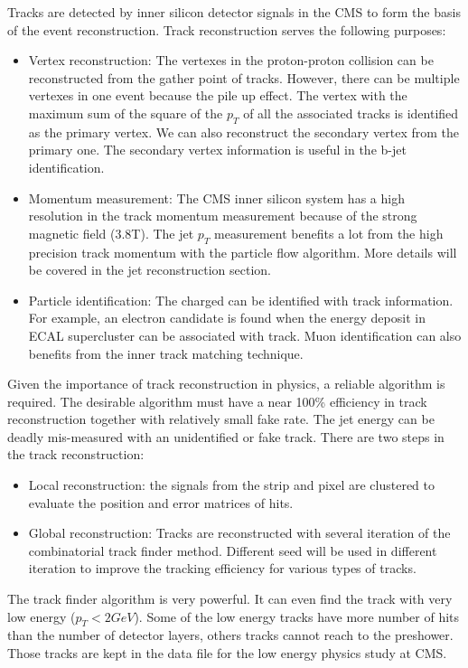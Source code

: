 Tracks are detected by inner silicon detector signals in the CMS to form the basis of the event reconstruction. Track reconstruction serves the following purposes: 
\begin{itemize}
\item Vertex reconstruction: The vertexes in the proton-proton collision can be reconstructed from the gather point of tracks. However, there can be multiple vertexes in one event because the pile up effect. The vertex with the maximum sum of the square of the $p_{T}$ of all the associated tracks is identified as the primary vertex. We can also reconstruct the secondary vertex from the primary one. The secondary vertex information is useful in the b-jet identification.
\item Momentum measurement: The CMS inner silicon system has a high resolution in the track momentum measurement because of the strong magnetic field (3.8T). The jet $p_{T}$ measurement benefits a lot from the high precision track momentum with the particle flow algorithm. More details will be covered in the jet reconstruction section.
\item Particle identification: The charged can be identified with track information. For example, an electron candidate is found when the energy deposit in ECAL supercluster can be associated with track. Muon identification can also benefits from the inner track matching technique.
\end{itemize}

Given the importance of track reconstruction in physics, a reliable algorithm is required. The desirable algorithm must have a near 100\% efficiency in track reconstruction together with relatively small fake rate. The jet energy can be deadly mis-measured with an unidentified or fake track.
There are two steps in the track reconstruction: 
\begin{itemize}
\item Local reconstruction: the signals from the strip and pixel are clustered to evaluate the position and error matrices of hits.
\item Global reconstruction: Tracks are reconstructed with several iteration of the combinatorial track finder method\cite{Adam:2005cg}. Different seed will be used in different iteration to improve the tracking efficiency for various types of tracks.
\end{itemize}
The track finder algorithm is very powerful. It can even find the track with very low energy ($p_{T}<2 GeV$). Some of the low energy tracks have more number of hits than the number of detector layers, others tracks cannot reach to the preshower. Those tracks are kept in the data file for the low energy physics study at CMS. 

